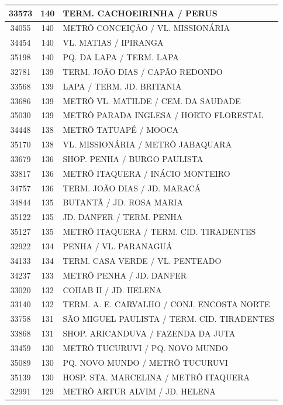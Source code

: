 \documentclass[
	12pt,				%
	oneside,			%
	a4paper,			%
	english,			%
	brazil				%
	]{abntex2ppgsi}
\begin{document}
{{{\begin{apendicesenv}
\begin{longtable}{c|c|p{7cm}}
 \hline 
33573 &	140 &	TERM. CACHOEIRINHA / PERUS \\ 
 \hline 
34055 &	140 &	METRÔ CONCEIÇÃO / VL. MISSIONÁRIA \\ 
 \hline 
34454 &	140 &	VL. MATIAS / IPIRANGA \\ 
 \hline 
35198 &	140 &	PQ. DA LAPA / TERM. LAPA \\ 
 \hline 
32781 &	139 &	TERM. JOÃO DIAS / CAPÃO REDONDO \\ 
 \hline 
33568 &	139 &	LAPA / TERM. JD. BRITANIA \\ 
 \hline 
33686 &	139 &	METRÔ VL. MATILDE / CEM. DA SAUDADE \\ 
 \hline 
35030 &	139 &	METRÔ PARADA INGLESA / HORTO FLORESTAL \\ 
 \hline 
34448 &	138 &	METRÔ TATUAPÉ / MOOCA \\ 
 \hline 
35170 &	138 &	VL. MISSIONÁRIA / METRÔ JABAQUARA \\ 
 \hline 
33679 &	136 &	SHOP. PENHA / BURGO PAULISTA \\ 
 \hline 
33817 &	136 &	METRÔ ITAQUERA / INÁCIO MONTEIRO \\ 
 \hline 
34757 &	136 &	TERM. JOÃO DIAS / JD. MARACÁ \\ 
 \hline 
34844 &	135 &	BUTANTÃ / JD. ROSA MARIA \\ 
 \hline 
35122 &	135 &	JD. DANFER / TERM. PENHA \\ 
 \hline 
35127 &	135 &	METRÔ ITAQUERA / TERM. CID. TIRADENTES \\ 
 \hline 
32922 &	134 &	PENHA / VL. PARANAGUÁ \\ 
 \hline 
34133 &	134 &	TERM. CASA VERDE / VL. PENTEADO \\ 
 \hline 
34237 &	133 &	METRÔ PENHA / JD. DANFER \\ 
 \hline 
33020 &	132 &	COHAB II / JD. HELENA \\ 
 \hline 
33140 &	132 &	TERM. A. E. CARVALHO / CONJ. ENCOSTA NORTE \\ 
 \hline 
33758 &	131 &	SÃO MIGUEL PAULISTA / TERM. CID. TIRADENTES \\ 
 \hline 
33868 &	131 &	SHOP. ARICANDUVA / FAZENDA DA JUTA \\ 
 \hline 
33459 &	130 &	METRÔ TUCURUVI / PQ. NOVO MUNDO \\ 
 \hline 
35089 &	130 &	PQ. NOVO MUNDO / METRÔ TUCURUVI \\ 
 \hline 
35139 &	130 &	HOSP. STA. MARCELINA / METRÔ ITAQUERA \\ 
 \hline 
32991 &	129 &	METRÔ ARTUR ALVIM / JD. HELENA \\ 

\end{longtable}
\end{apendicesenv}}}}
\end{document}
